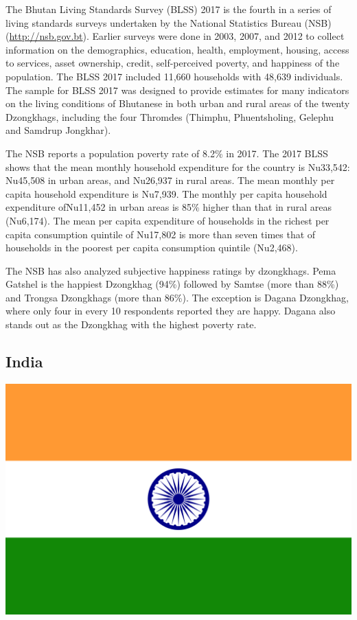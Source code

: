 \documentclass[13 pt,]{book}
\begin{document}
The Bhutan Living Standards Survey (BLSS) 2017 is the fourth in a series
of living standards surveys undertaken by the National Statistics Bureau
(NSB) (\url{http://nsb.gov.bt}). Earlier surveys were done in 2003,
2007, and 2012 to collect information on the demographics, education,
health, employment, housing, access to services, asset ownership,
credit, self-perceived poverty, and happiness of the population. The
BLSS 2017 included 11,660 households with 48,639 individuals. The sample
for BLSS 2017 was designed to provide estimates for many indicators on
the living conditions of Bhutanese in both urban and rural areas of the
twenty Dzongkhags, including the four Thromdes (Thimphu, Phuentsholing,
Gelephu and Samdrup Jongkhar).

The NSB reports a population poverty rate of 8.2\% in 2017. The 2017
BLSS shows that the mean monthly household expenditure for the country
is Nu33,542: Nu45,508 in urban areas, and Nu26,937 in rural areas. The
mean monthly per capita household expenditure is Nu7,939. The monthly
per capita household expenditure ofNu11,452 in urban areas is 85\%
higher than that in rural areas (Nu6,174). The mean per capita
expenditure of households in the richest per capita consumption quintile
of Nu17,802 is more than seven times that of households in the poorest
per capita consumption quintile (Nu2,468).

The NSB has also analyzed subjective happiness ratings by dzongkhags.
Pema Gatshel is the happiest Dzongkhag (94\%) followed by Samtse (more
than 88\%) and Trongsa Dzongkhags (more than 86\%). The exception is
Dagana Dzongkhag, where only four in every 10 respondents reported they
are happy. Dagana also stands out as the Dzongkhag with the highest
poverty rate.

\subsection{India}\label{india}

\begin{flushleft}\includegraphics[width=0.4\linewidth]{figures/Flag_of_India} \end{flushleft}
\end{document}
